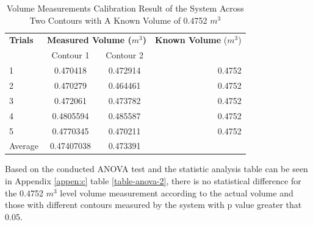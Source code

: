\begin{enumerate}
	      \begin{table}[H]
		      \centering
		      \begin{threeparttable}
			      \caption{Volume Measurements Calibration Result of the System Across Two Contours with A Known Volume of 0.4752 $m^3$}
			      \label{table:test_case_2-2_results}
			      \begin{tabular}{l c c r}
				      \toprule
				      \textbf{Trials} & \multicolumn{2}{c}{\textbf{Measured Volume ($m^{3}$)}} & \textbf{Known Volume} ($m^{3}$)          \\
				      {}              & Contour 1                                              & Contour 2                       & {}     \\ \midrule
				      1               & 0.470418                                               & 0.472914                        & 0.4752 \\
				      2               & 0.470279                                               & 0.464461                        & 0.4752 \\
				      3               & 0.472061                                               & 0.473782                        & 0.4752 \\
				      4               & 0.4805594                                              & 0.485587                        & 0.4752 \\
				      5               & 0.4770345                                              & 0.470211                        & 0.4752 \\ \midrule
				      Average         & 0.47407038                                             & 0.473391                        & {}     \\ \bottomrule
			      \end{tabular}
		      \end{threeparttable}
	      \end{table}


	      Based on the conducted ANOVA test and the statistic analysis table can be seen in Appendix \ref{appen:c} table \ref{table-anova-2}, there is no statistical difference for the 0.4752 $m^3$ level volume measurement according to the actual volume and those with different contours measured by the system with p value greater that 0.05.


\end{enumerate}
